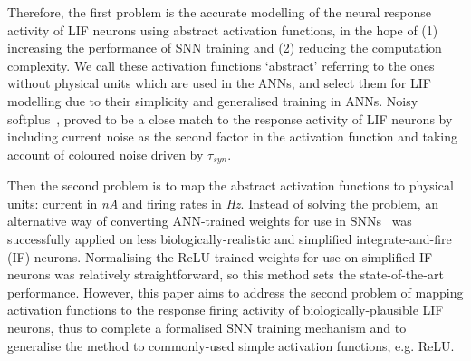 \documentclass{article}
\begin{document}
	
	Therefore, the first problem is the accurate modelling of the neural response activity of LIF neurons using abstract activation functions, in the hope of (1) increasing the performance of SNN training and (2) reducing the computation complexity.
	We call these activation functions `abstract' referring to the ones without physical units which are used in the ANNs, and select them for LIF modelling due to their simplicity and generalised training in ANNs.
	Noisy softplus~\cite{liu2016noisy}, proved to be a close match to the response activity of LIF neurons by including current noise as the second factor in the activation function and taking account of coloured noise driven by $\tau_{syn}$.
	
	
	Then the second problem is to map the abstract activation functions to physical units: current in \textit{nA} and firing rates in \textit{Hz}.
	Instead of solving the problem, an alternative way of converting ANN-trained weights for use in SNNs~\cite{cao2015spiking,diehl2015fast} was successfully applied 
	on less biologically-realistic and simplified integrate-and-fire (IF) neurons.
	Normalising the ReLU-trained weights for use on simplified IF neurons was relatively straightforward, so this method sets the state-of-the-art performance.
	However, this paper aims to address the second problem of mapping activation functions to the response firing activity of biologically-plausible LIF neurons, thus to complete a formalised SNN training mechanism and to generalise the method to commonly-used simple activation functions, e.g. ReLU.
	
	
	
\end{document}
